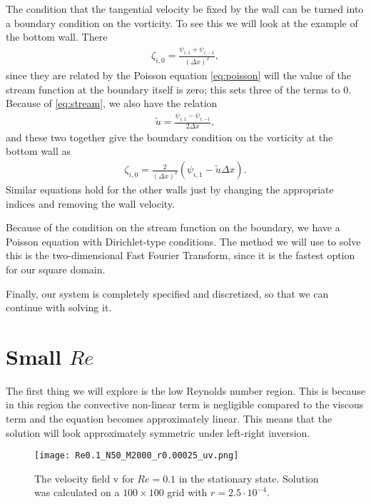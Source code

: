 \documentclass[10pt,a4paper,twocolumn]{article}
\renewcommand{\vec}[1]{\bm{\mathrm{#1}}}
\begin{document}
The condition that the tangential velocity be fixed by the wall can be turned into a boundary condition on the vorticity. To see this we will look at the example of the bottom wall. There
%
\begin{align}
    \zeta_{i,0} = \frac{\psi_{i,1} + \psi_{i, -1}}{(\Delta x)^2},
\end{align}
%
since they are related by the Poisson equation \cref{eq:poisson} will the value of the stream function at the boundary itself is zero; this sets three of the terms to $0$. Because of \cref{eq:stream}, we also have the relation 
%
\begin{align}
    \tilde{u} = \frac{\psi_{i,1} - \psi_{i,-1}}{2 \Delta x},
\end{align}
%
and these two together give the boundary condition on the vorticity at the bottom wall as
%
\begin{align}
    \zeta_{i,0} = \frac{2}{(\Delta x)^2} \left( \psi_{i,1} - \tilde{u} \Delta x\right).
\end{align}
%
Similar equations hold for the other walls just by changing the appropriate indices and removing the wall velocity.

Because of the condition on the stream function on the boundary, we have a Poisson equation with Dirichlet-type conditions. The method we will use to solve this is the two-dimensional Fast Fourier Transform, since it is the fastest option for our square domain.

Finally, our system is completely specified and discretized, so that we can continue with solving it.


\section{Small \texorpdfstring{$Re$}{Re}}

The first thing we will explore is the low Reynolds number region. This is because in this region the convective non-linear term is negligible compared to the viscous term and the equation becomes approximately linear. This means that the solution will look approximately symmetric under left-right inversion.


\begin{figure}[!h]
    \centering
    \texttt{[image: Re0.1\_N50\_M2000\_r0.00025\_uv.png]}
    \caption{The velocity field $\vec{v}$ for $Re=0.1$ in the stationary state. Solution was calculated on a $100 \times 100$ grid with $r=2.5 \cdot 10^{-4}$.}
    \label{fig:Re0.1_uv}
\end{figure}
\end{document}
